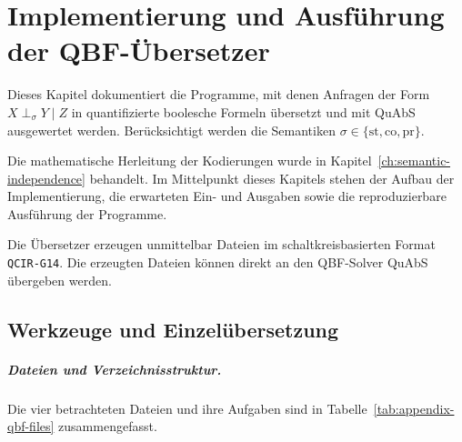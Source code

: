 \chapter{Implementierung und Ausführung der QBF-Übersetzer}
\label{ch:appendix-qbf-tools}

Dieses Kapitel dokumentiert die Programme, mit denen Anfragen der Form
\(X\perp_\sigma Y\mid Z\) in quantifizierte boolesche Formeln
übersetzt und mit QuAbS ausgewertet werden. Berücksichtigt werden die
Semantiken
\(\sigma\in\{\mathrm{st},\mathrm{co},\mathrm{pr}\}\).

Die mathematische Herleitung der Kodierungen wurde in
Kapitel~\ref{ch:semantic-independence} behandelt. Im Mittelpunkt dieses
Kapitels stehen der Aufbau der Implementierung, die erwarteten
Ein- und Ausgaben sowie die reproduzierbare Ausführung der Programme.

Die Übersetzer erzeugen unmittelbar Dateien im schaltkreisbasierten
Format \texttt{QCIR-G14}. Die erzeugten Dateien können direkt an den 
QBF-Solver QuAbS übergeben werden.

\section{Werkzeuge und Einzelübersetzung}
\label{sec:appendix-qbf-single-translation}

\paragraph{Dateien und Verzeichnisstruktur.}

Die vier betrachteten Dateien und ihre Aufgaben sind in
Tabelle~\ref{tab:appendix-qbf-files} zusammengefasst.

